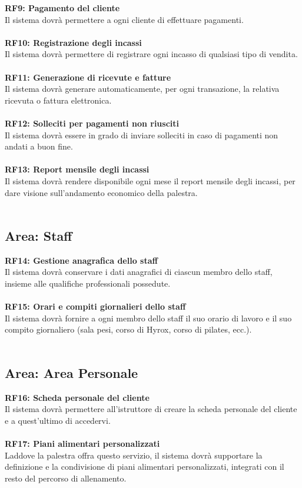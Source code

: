 \documentclass[12pt,a4paper]{report}
\begin{document}
\noindent\textbf{RF9: Pagamento del cliente}\\
Il sistema dovrà permettere a ogni cliente di effettuare pagamenti.\\
\\
\noindent\textbf{RF10: Registrazione degli incassi}\\
Il sistema dovrà permettere di registrare ogni incasso di qualsiasi tipo di vendita.\\
\\
\noindent\textbf{RF11: Generazione di ricevute e fatture}\\
Il sistema dovrà generare automaticamente, per ogni transazione, la relativa ricevuta o fattura elettronica.\\
\\
\noindent\textbf{RF12: Solleciti per pagamenti non riusciti}\\
Il sistema dovrà essere in grado di inviare solleciti in caso di pagamenti non andati a buon fine.\\
\\
\noindent\textbf{RF13: Report mensile degli incassi}\\
Il sistema dovrà rendere disponibile ogni mese il report mensile degli incassi, per dare visione sull'andamento economico della palestra.\\
\\
\subsection{Area: Staff}

\noindent\textbf{RF14: Gestione anagrafica dello staff}\\
Il sistema dovrà conservare i dati anagrafici di ciascun membro dello staff, insieme alle qualifiche professionali possedute.\\
\\
\noindent\textbf{RF15: Orari e compiti giornalieri dello staff}\\
Il sistema dovrà fornire a ogni membro dello staff il suo orario di lavoro e il suo compito giornaliero (sala pesi, corso di Hyrox, corso di pilates, ecc.).\\
\\
\subsection{Area: Area Personale}

\noindent\textbf{RF16: Scheda personale del cliente}\\
Il sistema dovrà permettere all'istruttore di creare la scheda personale del cliente e a quest'ultimo di accedervi.\\
\\
\noindent\textbf{RF17: Piani alimentari personalizzati}\\
Laddove la palestra offra questo servizio, il sistema dovrà supportare la definizione e la condivisione di piani alimentari personalizzati, integrati con il resto del percorso di allenamento.\\
\\
\end{document}
